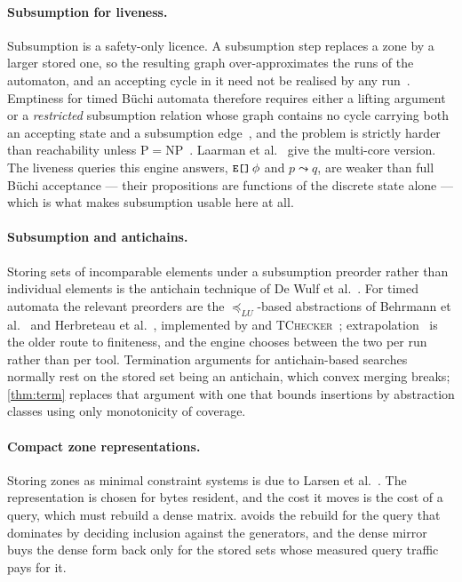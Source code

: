 \paragraph{Subsumption for liveness.}
Subsumption is a safety-only licence.  A subsumption step replaces a zone by a
larger stored one, so the resulting graph over-approximates the runs of the
automaton, and an accepting cycle in it need not be realised by any
run~\cite{Tripakis09}.  Emptiness for timed B\"uchi automata therefore requires
either a lifting argument~\cite{Tripakis09,Li09} or a \emph{restricted}
subsumption relation whose graph contains no cycle carrying both an accepting
state and a subsumption edge~\cite{Herbreteau12b}, and the problem is strictly
harder than reachability unless $\mathrm{P}=\mathrm{NP}$~\cite{Herbreteau16}.
Laarman et al.~\cite{Laarman13} give the multi-core version.  The liveness
queries this engine answers, $\texttt{\small E[]}\,\phi$ and $p \leadsto q$, are weaker
than full B\"uchi acceptance --- their propositions are functions of the
discrete state alone --- which is what makes subsumption usable here at all.

\paragraph{Subsumption and antichains.}
Storing sets of incomparable elements under a subsumption preorder rather than
individual elements is the antichain technique of De Wulf et al.~\cite{Wulf06}.
For timed automata the relevant preorders are the $\preceq_{LU}$-based
abstractions of Behrmann et al.~\cite{Behrmann06} and Herbreteau et
al.~\cite{Herbreteau12}, implemented by \uppaal{} and
\textsc{TChecker}~\cite{Herbreteau13}; extrapolation~\cite{Daws98,Behrmann06} is
the older route to finiteness, and the engine chooses between the two per run
rather than per tool.  Termination arguments for antichain-based searches
normally rest on the stored set being an antichain, which convex merging breaks;
\cref{thm:term} replaces that argument with one that bounds insertions by
abstraction classes using only monotonicity of coverage.

\paragraph{Compact zone representations.}
Storing zones as minimal constraint systems is due to Larsen et
al.~\cite{LarsenLPY97}.  The representation is chosen for bytes resident, and
the cost it moves is the cost of a query, which must rebuild a dense matrix.
 avoids the rebuild for the query that dominates by deciding
inclusion against the generators, and the dense mirror buys the dense form back
only for the stored sets whose measured query traffic pays for it.

